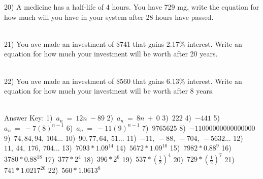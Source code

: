\documentclass[12pt]{article}
\begin{document}
20) A medicine has a half-life of 4 hours. You have 729 mg, write the equation for how much will you have in your system after 28 hours have passed. \\ \\
 

\hrulefill









21) You ave made an investment of \$741 that gains 2.17\% interest. Write an equation for how much your investment will be worth after 20 years. \\ \\
 

\hrulefill






22) You ave made an investment of \$560 that gains 6.13\% interest. Write an equation for how much your investment will be worth after 8 years. \\ \\
 

\hrulefill


Answer Key: 1)~$a_n~=~12n~-89$\hspace{.5 in} 2)~$a_n~=~8n~+~0$\hspace{.5 in} 3)~$222$\hspace{.5 in} 4)~$-441$\hspace{.5 in} 5)~$a_n~=~-7(8)^{n-1}$\hspace{.5 in} 6)~$a_n~=~-11(9)^{n-1}$\hspace{.5 in} 7)~$9765625$\hspace{.5 in} 8)~$-11000000000000000$\hspace{.5 in} 9)~$74, 84, 94,~104\ldots $\hspace{.5 in} 10)~$90, 77, 64,~51\ldots $\hspace{.5 in} 11)~$-11,~-88,~-704,~-5632\ldots $\hspace{.5 in} 12)~$11,~44,~176,~704\ldots $\hspace{.5 in} 13)~$7093*1.09^{14}$\hspace{.5 in} 14)~$5672*1.09^{10}$\hspace{.5 in} 15)~$7982*0.88^{9}$\hspace{.5 in} 16)~$3780*0.88^{18}$\hspace{.5 in} 17)~$377*2^{4}$\hspace{.5 in} 18)~$396*2^{6}$\hspace{.5 in} 19)~$537*(\frac{1}{2})^{4}$\hspace{.5 in} 20)~$729*(\frac{1}{2})^{7}$\hspace{.5 in} 21)~$741*1.0217^{20}$\hspace{.5 in} 22)~$560*1.0613^{8}$\hspace{.5 in} 
\end{document}
